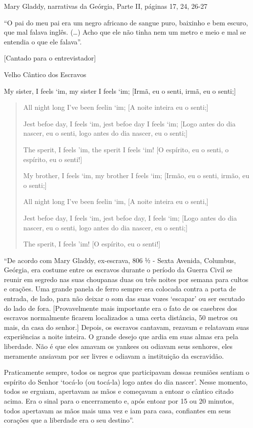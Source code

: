 Mary Gladdy, narrativas da Geórgia, Parte II, páginas 17, 24, 26-27

``O pai do meu pai era um negro africano de sangue puro, baixinho e bem
escuro, que mal falava inglês. (\ldots{}) Acho que ele não tinha nem um
metro e meio e mal se entendia o que ele falava''.

{[}Cantado para o entrevistador{]}

Velho Cântico dos Escravos

My sister, I feels `im, my sister I feels `im; {[}Irmã, eu o senti,
irmã, eu o senti;{]}

\begin{quote}
All night long I've been feelin `im; {[}A noite inteira eu o senti;{]}

Jest befoe day, I feels `im, jest befoe day I feels `im; {[}Logo antes
do dia nascer, eu o senti, logo antes do dia nascer, eu o senti;{]}

The sperit, I feels 'im, the sperit I feels `im! {[}O espírito, eu o
senti, o espírito, eu o senti!{]}

My brother, I feels `im, my brother I feels `im; {[}Irmão, eu o senti,
irmão, eu o senti;{]}

All night long I've been feelin `im, {[}A noite inteira eu o senti,{]}

Jest befoe day, I feels `im, jest befoe day, I feels `im; {[}Logo antes
do dia nascer, eu o senti, logo antes do dia nascer, eu o senti;{]}

The sperit, I feels 'im! {[}O espírito, eu o senti!{]}
\end{quote}

``De acordo com Mary Gladdy, ex-escrava, 806 ½ - Sexta Avenida,
Columbus, Geórgia, era costume entre os escravos durante o período da
Guerra Civil se reunir em segredo nas suas choupanas duas ou três noites
por semana para cultos e orações. Uma grande panela de ferro sempre era
colocada contra a porta de entrada, de lado, para não deixar o som das
suas vozes `escapar' ou ser escutado do lado de fora. {[}Provavelmente
mais importante era o fato de os casebres dos escravos normalmente
ficarem localizados a uma certa distância, 50 metros ou mais, da casa do
senhor.{]} Depois, os escravos cantavam, rezavam e relatavam suas
experiências a noite inteira. O grande desejo que ardia em suas almas
era pela liberdade. Não é que eles amavam os yankees ou odiavam seus
senhores, eles meramente ansiavam por ser livres e odiavam a instituição
da escravidão.

Praticamente sempre, todos os negros que participavam dessas reuniões
sentiam o espírito do Senhor `tocá-lo (ou tocá-la) logo antes do dia
nascer'. Nesse momento, todos se erguiam, apertavam as mãos e começavam
a entoar o cântico citado acima. Era o sinal para o encerramento e, após
entoar por 15 ou 20 minutos, todos apertavam as mãos mais uma vez e iam
para casa, confiantes em seus corações que a liberdade era o seu
destino''.


